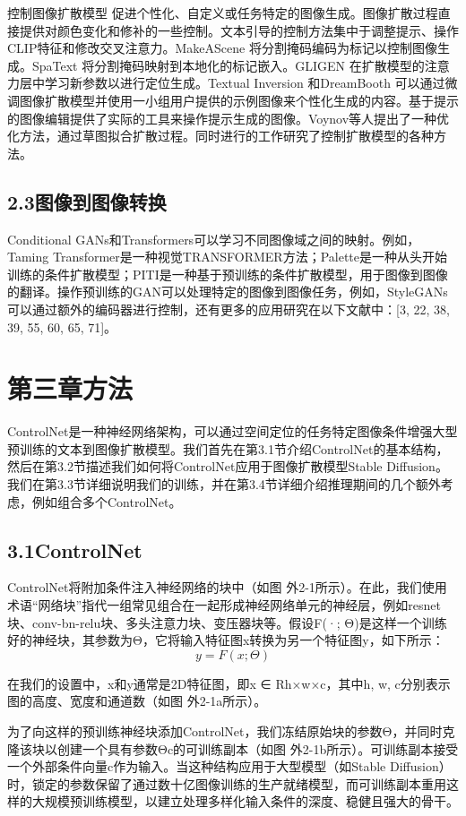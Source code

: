 \documentclass[a4paper,AutoFakeBold,oneside,12pt]{book}
\begin{document}
\begin{nopagenumber}
控制图像扩散模型 促进个性化、自定义或任务特定的图像生成。图像扩散过程直接提供对颜色变化和修补的一些控制。文本引导的控制方法集中于调整提示、操作CLIP特征和修改交叉注意力。MakeAScene 将分割掩码编码为标记以控制图像生成。SpaText 将分割掩码映射到本地化的标记嵌入。GLIGEN 在扩散模型的注意力层中学习新参数以进行定位生成。Textual Inversion 和DreamBooth 可以通过微调图像扩散模型并使用一小组用户提供的示例图像来个性化生成的内容。基于提示的图像编辑提供了实际的工具来操作提示生成的图像。Voynov等人提出了一种优化方法，通过草图拟合扩散过程。同时进行的工作研究了控制扩散模型的各种方法。
\section*{2.3\quad{}图像到图像转换}
Conditional GANs和Transformers可以学习不同图像域之间的映射。例如，Taming Transformer是一种视觉TRANSFORMER方法；Palette是一种从头开始训练的条件扩散模型；PITI是一种基于预训练的条件扩散模型，用于图像到图像的翻译。操作预训练的GAN可以处理特定的图像到图像任务，例如，StyleGANs可以通过额外的编码器进行控制，还有更多的应用研究在以下文献中：[3, 22, 38, 39, 55, 60, 65, 71]。
\newpage


\chapter*{第三章\quad{}方法}
\newtranschapter
ControlNet是一种神经网络架构，可以通过空间定位的任务特定图像条件增强大型预训练的文本到图像扩散模型。我们首先在第3.1节介绍ControlNet的基本结构，然后在第3.2节描述我们如何将ControlNet应用于图像扩散模型Stable Diffusion。我们在第3.3节详细说明我们的训练，并在第3.4节详细介绍推理期间的几个额外考虑，例如组合多个ControlNet。

\section*{3.1\quad{}ControlNet}
ControlNet将附加条件注入神经网络的块中（如图 外2-1所示）。在此，我们使用术语“网络块”指代一组常见组合在一起形成神经网络单元的神经层，例如resnet块、conv-bn-relu块、多头注意力块、变压器块等。假设F(·; Θ)是这样一个训练好的神经块，其参数为Θ，它将输入特征图x转换为另一个特征图y，如下所示：
\[ y = F(x; \Theta) \]

在我们的设置中，x和y通常是2D特征图，即x ∈ Rh×w×c，其中{h, w, c}分别表示图的高度、宽度和通道数（如图 外2-1a所示）。

为了向这样的预训练神经块添加ControlNet，我们冻结原始块的参数Θ，并同时克隆该块以创建一个具有参数Θc的可训练副本（如图 外2-1b所示）。可训练副本接受一个外部条件向量c作为输入。当这种结构应用于大型模型（如Stable Diffusion）时，锁定的参数保留了通过数十亿图像训练的生产就绪模型，而可训练副本重用这样的大规模预训练模型，以建立处理多样化输入条件的深度、稳健且强大的骨干。


\end{nopagenumber}
\end{document}
